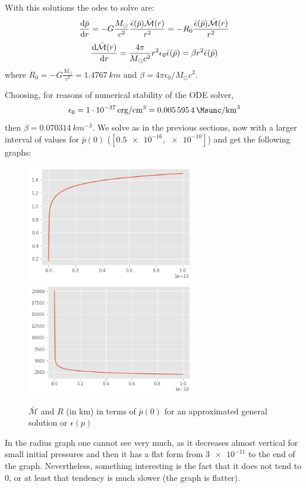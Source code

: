 \documentclass[a4paper]{article}
\newcommand\Mbar{\bar{\mathcal{M}}}
\newcommand\Msun{M_{\odot}}
\begin{document}
With this solutions the odes to solve are:
\begin{equation}
    \odv{\bar{p}}{r} = -G\frac{\Msun }{c^2}\frac{\bar{\epsilon}(\bar{p})\Mbar(r)}{r^2} = -R_0 \frac{\bar{\epsilon}(\bar{p})\Mbar(r)}{r^2}
\end{equation}
\begin{equation}
    \odv{\Mbar(r)}{r} = \frac{4\pi}{\Msun c^2} r^2 \epsilon_0 \bar{\epsilon}(\bar{p}) = \beta r^2 \bar{\epsilon}(\bar{p})
\end{equation}
where $R_0 = -G\frac{M_\odot}{c^2} = \qty{1.4767}{km}$ and $\beta = 4\pi \epsilon_0/M_\odot c^2$.

Choosing, for reasons of numerical stability of the ODE solver,
\[\epsilon_0 = \qty{1e-37}{erg/cm^3} = \qty{0.0055954}{ \Msunc/km^3}\]
then $\beta = \qty{0.070314}{km^{-3}}$.  We solve as in the previous sections, now with a larger interval of values for $\bar{p}(0)$ ($[\num{0.5e-16},\num{e-10}]$) and get the following graphs:

\begin{figure}[h]
    \includegraphics[width=7.3cm]{images/M-p0 gen.png}
    \includegraphics[width=7.3cm]{images/R-p0 gen.png}
    \centering
    \caption{$\Mbar$ and $R$ (in km) in terms of $\bar{p}(0)$ for an approximated general solution or $\epsilon(p)$}
\label{fig:Comparison3}
\end{figure}

In the radius graph one cannot see very much, as it decreases almost vertical for small initial pressures and then it has a flat form from $\num{3e-11}$ to the end of the graph. Nevertheless, something interesting is the fact that it does not tend to $0$, or at least that tendency is much slower (the graph is flatter). 
\end{document}
